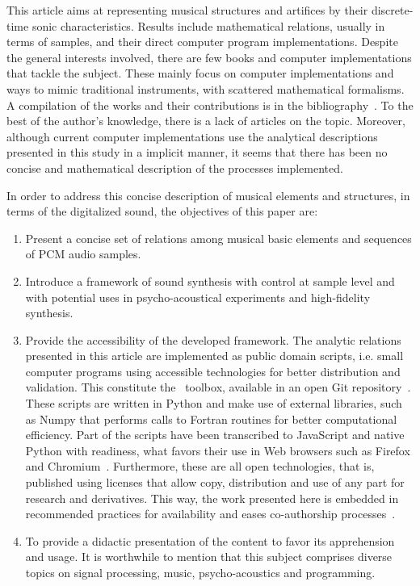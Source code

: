 This article aims at representing musical structures and artifices by their discrete-time sonic characteristics. Results include mathematical relations, usually in terms of samples, and their direct computer program implementations. Despite the general interests involved, there are few books and computer implementations that tackle the subject. These mainly focus on computer implementations and ways to mimic traditional instruments, with scattered mathematical formalisms. A compilation of the works and their contributions is in the bibliography~\cite{dissertacao}. To the best of the author's knowledge, there is a lack of articles on the topic. Moreover, although current computer implementations use the analytical descriptions presented in this study in a implicit manner, it seems that there has been no concise and mathematical description of the processes implemented. 

In order to address this concise description of musical elements and structures, in terms of the digitalized sound, the objectives of this paper are:

\begin{enumerate}

\item Present a concise set of relations among musical basic elements and sequences of PCM audio samples. 

\item Introduce a framework of sound synthesis with control at sample level and with potential uses in psycho-acoustical experiments and high-fidelity synthesis.

\item Provide the accessibility of the developed framework. The analytic relations presented in this article are implemented as public domain scripts, i.e. small computer programs using accessible technologies for better distribution and validation. This constitute the \massa\ toolbox, available in an open Git repository~\cite{gitBook}. These scripts are written in Python and make use of external libraries, such as Numpy that performs calls to Fortran routines for better computational efficiency. Part of the scripts have been transcribed to JavaScript and native Python with readiness, what favors their use in Web browsers such as Firefox and Chromium~\cite{numpy, audiolab, tutpython, python}. Furthermore, these are all open technologies, that is, published using licenses that allow copy, distribution and use of any part for research and derivatives. This way, the work presented here is embedded in recommended practices for availability and eases co-authorship processes~\cite{Raymond,Lessig}.

\item To provide a didactic presentation of the content to favor its apprehension and usage. It is worthwhile to mention that this subject comprises diverse topics on signal processing, music, psycho-acoustics and programming.

\end{enumerate}

